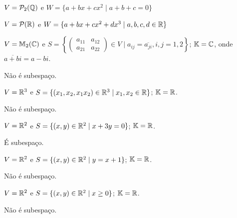 \documentclass[12pt]{exam}
\begin{document}
\begin{exercicio}
    $V = \mathcal{P}_2(\mathbb{Q})$ e $W = \{a + bx + cx^2 \mid a + b + c = 0\}$
\end{exercicio}

\begin{exercicio}
    $V = \mathcal{P}(\mathbb{R})$ e $W = \{a + bx + cx^2 + dx^3\mid a, b, c, d \in \mathbb{R}\}$
\end{exercicio}

\begin{exercicio}
	$V = \mathbb{M}_2(\mathbb{C})$ e $S = \left\{\begin{pmatrix} a_{11} & a_{12}\\ a_{21} & a_{22}\end{pmatrix} \in V \mid a_{ij} = \overline{a_{ji}}, i, j = 1, 2\right\}$; $\mathbb{K} = \mathbb{C}$, onde $\overline{a + bi} = a - bi$.
	\begin{solucao}
		N\~ao \'e subespa\c{c}o.
	\end{solucao}
\end{exercicio}

\begin{exercicio}
	$V = \mathbb{R}^3$ e $S = \{(x_1, x_2, x_1x_2) \in \mathbb{R}^3 \mid x_1, x_2 \in \mathbb{R}\}$; $\mathbb{K} = \mathbb{R}$.
	\begin{solucao}
		N\~ao \'e subespa\c{c}o.
	\end{solucao}
\end{exercicio}

\begin{exercicio}
	$V = \mathbb{R}^2$ e $S = \{(x, y) \in \mathbb{R}^2 \mid x + 3y = 0\}$; $\mathbb{K} = \mathbb{R}$.
	\begin{solucao}
		\'E subespa\c{c}o.
	\end{solucao}
\end{exercicio}

\begin{exercicio}
	$V = \mathbb{R}^2$ e $S = \{(x, y) \in \mathbb{R}^2 \mid y = x + 1\}$; $\mathbb{K} = \mathbb{R}$.
	\begin{solucao}
		N\~ao \'e subespa\c{c}o.
	\end{solucao}
\end{exercicio}

\begin{exercicio}
	$V = \mathbb{R}^2$ e $S = \{(x, y) \in \mathbb{R}^2 \mid x \ge 0\}$; $\mathbb{K} = \mathbb{R}$.
	\begin{solucao}
		N\~ao \'e subespa\c{c}o.
	\end{solucao}
\end{exercicio}
\end{document}
